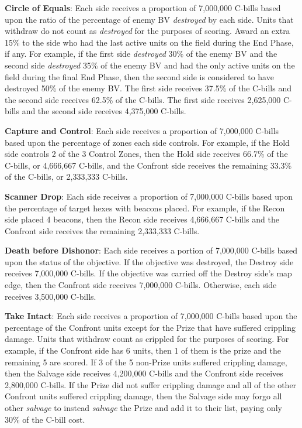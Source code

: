 \begin{description}

\item {\bfseries Circle of Equals}: Each side receives a proportion of 7,000,000 C-bills based upon the ratio of the percentage of enemy BV \emph{destroyed} by each side.
Units that withdraw do not count as \emph{destroyed} for the purposes of scoring.
Award an extra 15\% to the side who had the last active units on the field during the End Phase, if any.
For example, if the first side \emph{destroyed} 30\% of the enemy BV and the second side \emph{destroyed} 35\% of the enemy BV and had the only active units on the field during the final End Phase, then the second side is considered to have destroyed 50\% of the enemy BV.
The first side receives 37.5\% of the C-bills and the second side receives 62.5\% of the C-bills.
The first side receives 2,625,000 C-bills and the second side receives 4,375,000 C-bills.

\item {\bfseries Capture and Control}: Each side receives a proportion of 7,000,000 C-bills based upon the percentage of zones each side controls.
For example, if the Hold side controls 2 of the 3 Control Zones, then the Hold side receives 66.7\% of the C-bills, or 4,666,667 C-bills, and the Confront side receives the remaining 33.3\% of the C-bills, or 2,333,333 C-bills.

\item {\bfseries Scanner Drop}: Each side receives a proportion of 7,000,000 C-bills based upon the percentage of target hexes with beacons placed.
For example, if the Recon side placed 4 beacons, then the Recon side receives 4,666,667 C-bills and the Confront side receives the remaining 2,333,333 C-bills.

\item {\bfseries Death before Dishonor}: Each side receives a portion of 7,000,000 C-bills based upon the status of the objective.
If the objective was destroyed, the Destroy side receives 7,000,000 C-bills.
If the objective was carried off the Destroy side's map edge, then the Confront side receives 7,000,000 C-bills.
Otherwise, each side receives 3,500,000 C-bills.

\item {\bfseries Take Intact}: Each side receives a proportion of 7,000,000 C-bills based upon the percentage of the Confront units except for the Prize that have suffered crippling damage.
Units that withdraw count as crippled for the purposes of scoring.
For example, if the Confront side has 6 units, then 1 of them is the prize and the remaining 5 are scored.
If 3 of the 5 non-Prize units suffered crippling damage, then the Salvage side receives 4,200,000 C-bills and the Confront side receives 2,800,000 C-bills.
If the Prize did not suffer crippling damage and all of the other Confront units suffered crippling damage, then the Salvage side may forgo all other \emph{salvage} to instead \emph{salvage} the Prize and add it to their list, paying only 30\% of the C-bill cost.


\end{description}
